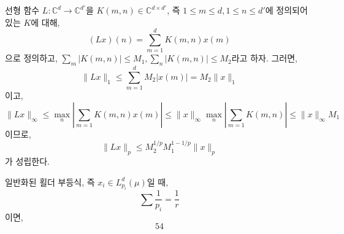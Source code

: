 \begin{example}
    선형 함수 $L: \mathbb{C}^d \to \mathbb{C}^{d'}$을 $K(m, n) \in \mathbb{C}^{d \times d'}$, 즉 $1 \leq m \leq d, 1 \leq n \leq d'$에 정의되어 있는 $K$에 대해,
    \begin{equation*}
        (Lx)(n) = \sum_{m = 1}^d K(m, n)x(m)
    \end{equation*}
    으로 정의하고, $\sum_m |K(m, n)| \leq M_1, \sum_n |K(m, n)| \leq M_2$라고 하자.
    그러면,
    \begin{equation*}
        \|Lx\|_1 \leq \sum_{m = 1}^d M_2 |x(m)| = M_2\|x\|_1
    \end{equation*}
    이고,
    \begin{equation*}
        \|Lx\|_\infty \leq \max_n \left| \sum_{m = 1} K(m, n)x(m) \right| \leq \|x\|_\infty \max_n \left| \sum_{m = 1} K(m,n) \right| \leq \|x\|_\infty M_1
    \end{equation*}
    이므로,
    \begin{equation*}
        \|Lx\|_p \leq M_2^{1/p} M_1^{1 - 1/p} \|x\|_p
    \end{equation*}
    가 성립한다.
\end{example}

\begin{example}
    일반화된 횔더 부등식, 즉 $x_i \in L_{p_i}^d (\mu)$일 때,
    \begin{equation*}
        \sum \frac{1}{p_i} = \frac{1}{r}
    \end{equation*}
    이면,
    \begin{equation*}
        54
    \end{equation*}
\end{example}
